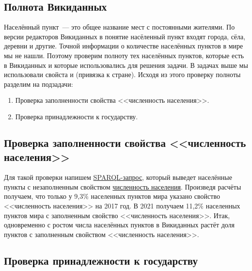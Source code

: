 \subsection{Полнота Викиданных}

Населённый пункт~--- это общее название мест с постоянными жителями\autocite{Humansettlements_Dictionary}. 
По версии редакторов Викиданных в понятие насёленный пункт входят города, сёла, деревни 
и другие.
Точной информации о количестве населённых пунктов в мире мы не нашли. 
Поэтому проверим полноту тех населённых пунктов, которые есть в Викиданных 
и которые использовались для решения задачи. 
В задачах выше мы использовали свойста  и 
 (привязка к стране). 
Исходя из этого проверку полноты разделим на подзадачи: 
\begin{enumerate} 
  \item Проверка заполненности свойства <<численность населения>>.
  \item Проверка принадлежности к государству.
\end{enumerate}


\subsection{Проверка заполненности свойства <<численность населения>> }

Для такой проверки напишем \href{https://w.wiki/4FUz}{SPARQL-запрос}, 
который выведет населённые пункты 
с незаполненным свойством \href{http://www.wikidata.org/entity/P1082}{численность населения}. 
Произведя расчёты получаем, что только у 9,3\% населенных пунктов мира 
указано свойство <<численность населения>> на 2017 год. 
В 2021 получаем 11,2\% населенных пунктов мира с заполненным свойство <<численность населения>>. 
Итак, одновременно с ростом числа населённых пунктов в Викиданных 
растёт доля пунктов с заполненным свойством <<численность населения>>.


\subsection{Проверка принадлежности к государству}

